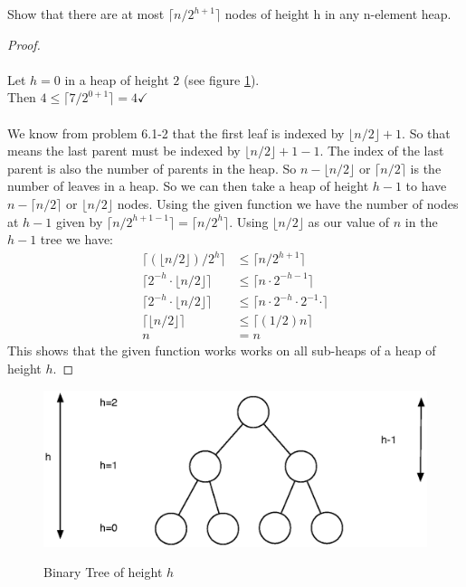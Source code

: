 \documentclass[12pt]{article}
\newenvironment{problem}[2][Problem]{\begin{trivlist}
\item[\hskip \labelsep {\bfseries #1}\hskip \labelsep {\bfseries #2.}]}{\end{trivlist}}
\begin{document}
\begin{problem}{6.3-3} Show that there are at most $\lceil n/2^{h+1} \rceil$ nodes of height h in any n-element heap. \\
  \begin{proof}\ \\

   \\

  \indent Let $h = 0$ in a heap of height $2$ (see figure \ref{fig:bintree2}). \\
  \indent Then $4 \le \lceil 7/2^{0+1} \rceil = 4 \checkmark$ \\

   \\

  We know from problem 6.1-2 that the first leaf is indexed by $\lfloor n/2 \rfloor + 1$. So that means the last parent must
  be indexed by $\lfloor n/2 \rfloor +1 -1$. The index of the last parent is also the number of parents in the heap. So
  $n - \lfloor n/2 \rfloor$ or $\lceil n/2 \rceil$ is the number of leaves in a heap. So we can then take a heap of height $h - 1$
  to have $n - \lceil n/2 \rceil$ or $\lfloor n/2 \rfloor$ nodes. Using the given function we have the number of nodes at $h - 1$
  given by $\lceil n/2^{h+1-1} \rceil = \lceil n/2^{h} \rceil$. Using $\lfloor n/2 \rfloor$ as our
  value of $n$ in the $h - 1$ tree we have:
  \begin{align*}
    \lceil (\lfloor n/2 \rfloor)/2^{h} \rceil &\le \lceil n/2^{h+1} \rceil \\
    \lceil 2^{-h} \cdot \lfloor n/2 \rfloor \rceil &\le  \lceil n \cdot 2^{-h-1} \rceil \\
    \lceil 2^{-h} \cdot \lfloor n/2 \rfloor \rceil &\le  \lceil n \cdot 2^{-h}\cdot 2^{-1} \cdot \rceil \\
    \lceil \lfloor n/2 \rfloor \rceil &\le  \lceil (1/2)n\rceil \\
    n &= n
  \end{align*}
  This shows that the given function works works on all sub-heaps of a heap of height $h$.
  \end{proof}
  \begin{figure}[!h]
    \centering
    \caption{Binary Tree of height $h$}
    \includegraphics[scale=.75]{bin_tree2.eps}
    \label{fig:bintree2}
  \end{figure}
\end{problem}

\end{document}
